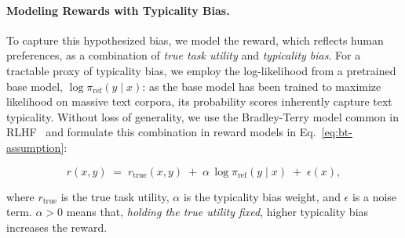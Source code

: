 \paragraph{Modeling Rewards with Typicality Bias.} To capture this hypothesized bias, we model the reward, which reflects human preferences, as a combination of \emph{true task utility} and \emph{typicality bias}. For a tractable proxy of typicality bias, we employ the log-likelihood from a pretrained base model, $\log \pi_{\mathrm{ref}}(y\mid x)$: as the base model has been trained to maximize likelihood on massive text corpora, its probability scores inherently capture text typicality. {Without loss of generality, we use the Bradley-Terry model common in RLHF~\citep{bradley1952rank,christiano2017deep,ouyang2022training} and formulate this combination in reward models in Eq.~\ref{eq:bt-assumption}}: 







\begin{equation}
r(x,y) \;=\; r_{\text{true}}(x,y) \;+\; \alpha \,\log \pi_{\text{ref}}(y \mid x) \;+\; \epsilon(x),
\label{eq:bt-assumption}
\end{equation}

where \(r_{\text{true}}\) is the true task utility, 
$\alpha$ is the typicality bias weight, 
and
\(\epsilon\) is a noise term. \(\alpha>0\) means that, \emph{holding the true utility fixed},
higher typicality bias increases the reward.


